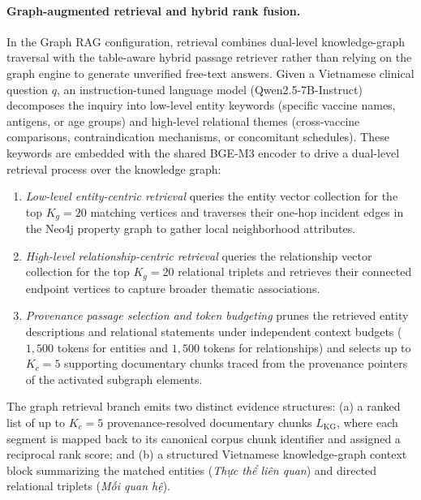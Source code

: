 \documentclass[sn-mathphys, oneside]{sn-jnl}
\newcommand{\vn}[1]{{\fontencoding{T5}\selectfont #1}}
\begin{document}
\paragraph{Graph-augmented retrieval and hybrid rank fusion.}
In the Graph RAG configuration, retrieval combines dual-level knowledge-graph traversal with the table-aware hybrid passage retriever rather than relying on the graph engine to generate unverified free-text answers. Given a Vietnamese clinical question $q$, an instruction-tuned language model (Qwen2.5-7B-Instruct) decomposes the inquiry into low-level entity keywords (specific vaccine names, antigens, or age groups) and high-level relational themes (cross-vaccine comparisons, contraindication mechanisms, or concomitant schedules). These keywords are embedded with the shared BGE-M3 encoder to drive a dual-level retrieval process over the knowledge graph:
\begin{enumerate}
\item \emph{Low-level entity-centric retrieval} queries the entity vector collection for the top $K_g = 20$ matching vertices and traverses their one-hop incident edges in the Neo4j property graph to gather local neighborhood attributes.
\item \emph{High-level relationship-centric retrieval} queries the relationship vector collection for the top $K_g = 20$ relational triplets and retrieves their connected endpoint vertices to capture broader thematic associations.
\item \emph{Provenance passage selection and token budgeting} prunes the retrieved entity descriptions and relational statements under independent context budgets ($1,500$ tokens for entities and $1,500$ tokens for relationships) and selects up to $K_c = 5$ supporting documentary chunks traced from the provenance pointers of the activated subgraph elements.
\end{enumerate}

The graph retrieval branch emits two distinct evidence structures: (a) a ranked list of up to $K_c = 5$ provenance-resolved documentary chunks $L_{\text{KG}}$, where each segment is mapped back to its canonical corpus chunk identifier and assigned a reciprocal rank score; and (b) a structured Vietnamese knowledge-graph context block summarizing the matched entities (\emph{\vn{Thực thể liên quan}}) and directed relational triplets (\emph{\vn{Mối quan hệ}}).
\end{document}
